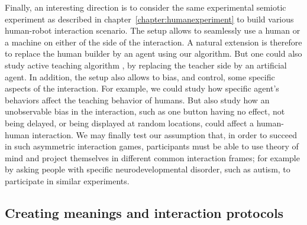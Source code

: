 Finally, an interesting direction is to consider the same experimental semiotic experiment as described in chapter~\ref{chapter:humanexperiment} to build various human-robot interaction scenario. The setup allows to seamlessly use a human or a machine on either of the side of the interaction. A natural extension is therefore to replace the human builder by an agent using our algorithm. But one could also study active teaching algorithm \cite{cakmak2012algorithmic}, by replacing the teacher side by an artificial agent. In addition, the setup also allows to bias, and control, some specific aspects of the interaction. For example, we could study how specific agent's behaviors affect the teaching behavior of humans. But also study how an unobservable bias in the  interaction, such as one button having no effect, not being delayed, or being displayed at random locations, could affect a human-human interaction. We may finally test our assumption that, in order to succeed in such asymmetric interaction games, participants must be able to use theory of mind and project themselves in different common interaction frames; for example by asking people with specific neurodevelopmental disorder, such as autism, to participate in similar experiments.






\subsection{Creating meanings and interaction protocols}



